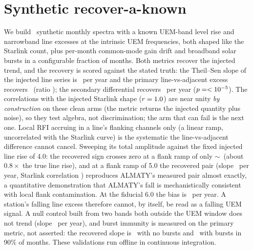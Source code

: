 \documentclass[twocolumn]{aastex631}
\begin{document}
\section{Synthetic recover-a-known}
\label{sec:synth}
We build \rfSynNMonths\ synthetic monthly spectra with a known UEM-band level rise and
narrowband line excesses at the intrinsic UEM frequencies, both shaped like the Starlink count, plus
per-month common-mode gain drift and broadband solar bursts in a configurable fraction of months.
Both metrics recover the injected trend, and the recovery is scored against the stated truth: the
Theil--Sen slope of the injected line series is \rfSynTruthLineSlope\ per year and the primary
line-vs-adjacent excess recovers \rfSynLineExcessSlope\ (ratio \rfSynLineRecovery); the
secondary differential recovers \rfSynSlope\ per year ($p=<10^{-5}$). The correlations with
the injected Starlink shape ($r=1.0$) are near unity \emph{by construction} on these
clean arms (the metric returns the injected quantity plus noise), so they test algebra, not
discrimination; the arm that can fail is the next one. Local RFI accruing in a line's flanking
channels only (a linear ramp, uncorrelated with the Starlink curve) is the systematic the
line-vs-adjacent difference cannot cancel. Sweeping its total amplitude against the fixed injected
line rise of 4.0: the recovered sign crosses zero at a flank ramp of only
$\sim$\rfSynFlankCross\ (about $0.8\times$ the true line rise), and at a flank ramp of 5.0
the recovered pair (slope \rfSynFlankAtFiveSlope\ per year, Starlink correlation
\rfSynFlankAtFiveCorr) reproduces ALMATY's measured pair almost exactly, a quantitative
demonstration that ALMATY's fall is mechanistically consistent with local flank contamination. At
the fiducial 6.0 the bias is \rfSynFlankBias\ per year. A station's falling line excess
therefore cannot, by itself, be read as a falling UEM signal. A null control built from two bands
both outside the UEM window does not trend (slope \rfSynCtrlSlope\ per year), and burst immunity
is measured on the primary metric, not asserted: the recovered slope is \rfSynBurstNone\ with no
bursts and \rfSynBurstHeavy\ with bursts in 90\% of months. These validations run offline in
continuous integration.
\end{document}
